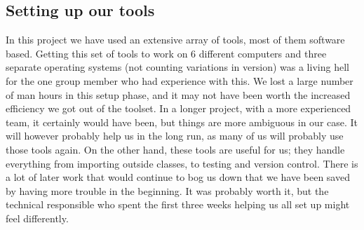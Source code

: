 \subsection{Setting up our tools}
In this project we have used an extensive array of tools, most of them software based. Getting this set of tools to work on 6 different computers and three separate operating systems (not counting variations in version) was a living hell for the one group member who had experience with this.
\newline
\newline
We lost a large number of man hours in this setup phase, and it may not have been worth the increased efficiency we got out of the toolset. In a longer project, with a more experienced team, it certainly would have been, but things are more ambiguous in our case. It will however probably help us in the long run, as many of us will probably use those tools again.
\newline
\newline
On the other hand, these tools are useful for us; they handle everything from importing outside classes, to testing and version control. There is a lot of later work that would continue to bog us down that we have been saved by having more trouble in the beginning. It was probably worth it, but the technical responsible who spent the first three weeks helping us all set up might feel differently.
